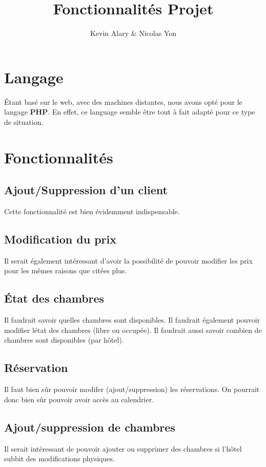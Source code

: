 \documentclass{article}
\title{Fonctionnalit\'es Projet}
\author{Kevin Alary \& Nicolas Yon}
\date{}
\begin{document}
\maketitle

\section{Langage}
\'Etant bas\'e sur le web, avec des machines distantes, nous avons opt\'e pour le langage \textbf{PHP}. En effet, ce language semble \^{e}tre tout \`a fait adapt\'e pour ce type de situation.

\section{Fonctionnalit\'es}

\subsection{Ajout/Suppression d'un client}
Cette fonctionnalit\'e est bien \'evidemment indispensable.

\subsection{Modification du prix}
Il serait \'egalement int\'eressant d'avoir la possibilit\'e de pouvoir modifier les prix pour les m\^{e}mes raisons que cit\'ees plus.

\subsection{\'Etat des chambres}
Il faudrait savoir quelles chambres sont disponibles. Il faudrait \'egalement pouvoir modifier l\'etat des chambres (libre ou occup\'ee). Il faudrait aussi savoir combien de chambres sont disponibles (par h\^{o}tel).

\subsection{R\'eservation}
Il faut bien s\^{u}r pouvoir modifer (ajout/suppression) les r\'eservations. On pourrait donc bien s\^{u}r pouvoir  avoir acc\`es au calendrier.

\subsection{Ajout/suppression de chambres}
Il serait int\'eressant de pouvoir ajouter ou supprimer des chambres si l'h\^{o}tel subbit des modifications physiques.
\end{document}
